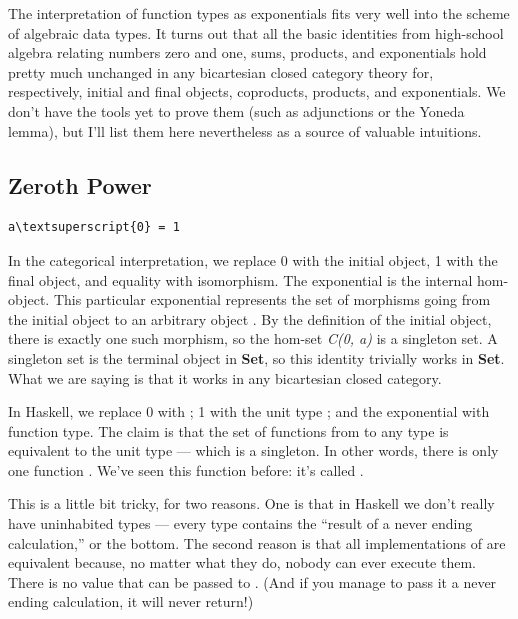 The interpretation of function types as exponentials fits very well into
the scheme of algebraic data types. It turns out that all the basic
identities from high-school algebra relating numbers zero and one, sums,
products, and exponentials hold pretty much unchanged in any bicartesian
closed category theory for, respectively, initial and final objects,
coproducts, products, and exponentials. We don't have the tools yet to
prove them (such as adjunctions or the Yoneda lemma), but I'll list them
here nevertheless as a source of valuable intuitions.

\subsection{Zeroth Power}\label{zeroth-power}

\begin{Verbatim}[commandchars=\\\{\}]
a\textsuperscript{0} = 1
\end{Verbatim}
In the categorical interpretation, we replace 0 with the initial object,
1 with the final object, and equality with isomorphism. The exponential
is the internal hom-object. This particular exponential represents the
set of morphisms going from the initial object to an arbitrary object
. By the definition of the initial object, there is exactly
one such morphism, so the hom-set \emph{C(0, a)} is a singleton set. A
singleton set is the terminal object in \textbf{Set}, so this identity
trivially works in \textbf{Set}. What we are saying is that it works in
any bicartesian closed category.

In Haskell, we replace 0 with ; 1 with the unit type
\code{()}; and the exponential with function type. The claim is that
the set of functions from  to any type  is
equivalent to the unit type --- which is a singleton. In other words,
there is only one function . We've seen
this function before: it's called .

This is a little bit tricky, for two reasons. One is that in Haskell we
don't really have uninhabited types --- every type contains the ``result
of a never ending calculation,'' or the bottom. The second reason is
that all implementations of  are equivalent because, no
matter what they do, nobody can ever execute them. There is no value
that can be passed to . (And if you manage to pass it a
never ending calculation, it will never return!)

